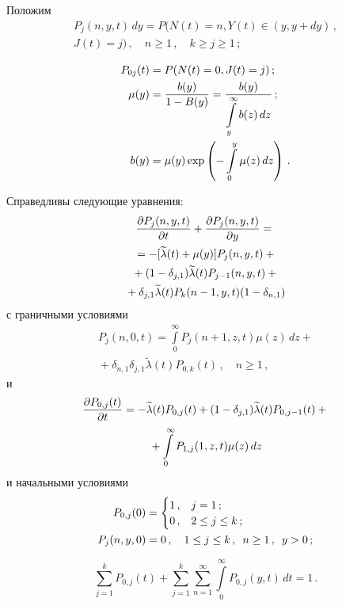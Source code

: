 \begin{multicols}{2}
Положим
\begin{multline*}
P_{j}(n,y,t)\,dy=P(N(t)=n,Y(t)\in(y,y+dy)\,,\\
 J(t)=j)\,,\quad  n\geq1\,,\quad k\geq j\geq1\,;
\end{multline*}
\vspace*{-14pt}

\noindent
\begin{align*}
P_{0j}(t)&=P(N(t)=0,J(t)=j)\,;\\
\mu(y)&=\displaystyle\frac{\displaystyle b(y)\mathstrut}{\displaystyle 1-B(y)\mathstrut}=\displaystyle\frac{\displaystyle b(y)\mathstrut}{\displaystyle \int\limits^{\infty}_{y}b(z)\,dz\mathstrut}\,;\\
b(y)&= \mu(y)\exp\left(-\int\limits_{0}^{y}\mu(z)\,dz\right)\,.
\end{align*}

Справедливы  следующие уравнения:
\begin{multline}
\displaystyle\frac{\displaystyle \partial P_{j}(n,y,t)\mathstrut}{\displaystyle \partial t\mathstrut}+\displaystyle\frac{\displaystyle \partial
P_{j}(n,y,t)\mathstrut}{\displaystyle \partial y\mathstrut}={}\\
{}=
-[\widetilde{\lambda}(t)+\mu(y)]P_{j}(n,y,t) +{}\\
{}+(1-\delta_{j,1})\widetilde{\lambda}(t)P_{j-1}(n,y,t)+{}\\
{}+
\delta_{j,1}\widetilde{\lambda}(t)P_{k}(n-1,y,t)(1-\delta_{n,1})
\label{q1}
\end{multline}
с граничными условиями
\begin{multline}
P_{j}(n,0,t)=\int\limits_{0}^{\infty}P_{j}(n+1,z,t)\mu(z)\,dz+{}\\
{}+\delta_{n,1}\delta_{j,1}
\widetilde{\lambda}(t)P_{0,k}(t)\,,\quad n\geq1\,,
\label{q2}
\end{multline}
и
\begin{multline}
\displaystyle\frac{\displaystyle \partial P_{0,j}(t)\mathstrut}{\displaystyle \partial t\mathstrut}=-\widetilde{\lambda}(t)P_{0,j}(t)+(1-\delta_{j,1})
\widetilde{\lambda}(t)P_{0,j-1}(t)+{}\\
{}+\int\limits_{0}^{\infty}P_{1,j}(1,z,t)\mu(z)\,dz
\label{q3}
\end{multline}
и начальными условиями
\begin{align}
P_{0,j}(0) &=
\begin{cases}
1\,, &  j=1\,;\\
0\,, & 2 \leq j\leq k\,;
\end{cases}
\notag\\
P_{j}(n,y,0)&=0\,,\quad 1\leq j \leq k\,,\enskip n \geq1\,,\enskip y>0\,;\label{q4}
\end{align}

\vspace*{-12pt}

\begin{equation}
\sum_{j=1}^{k} P_{0,j}(t)+\sum_{j=1}^{k}\sum_{n=1}^{\infty}\int\limits_{0}^{\infty}P_{0,j}(y,t)\,dt=1\,.
\label{q5}
\end{equation}


\end{multicols}

